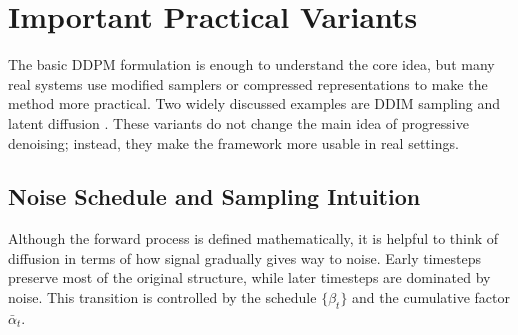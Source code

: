 \documentclass[a4paper,12pt]{article}
\newcommand{\alphabar}{\bar{\alpha}}
\begin{document}
\section{Important Practical Variants}
The basic DDPM formulation is enough to understand the core idea, but many real systems use modified samplers or compressed representations to make the method more practical. Two widely discussed examples are DDIM sampling \cite{song2020ddim} and latent diffusion \cite{rombach2022latent}. These variants do not change the main idea of progressive denoising; instead, they make the framework more usable in real settings.

\subsection{Noise Schedule and Sampling Intuition}
Although the forward process is defined mathematically, it is helpful to think of diffusion in terms of how signal gradually gives way to noise. Early timesteps preserve most of the original structure, while later timesteps are dominated by noise. This transition is controlled by the schedule $\{\beta_t\}$ and the cumulative factor $\alphabar_t$.
\end{document}
